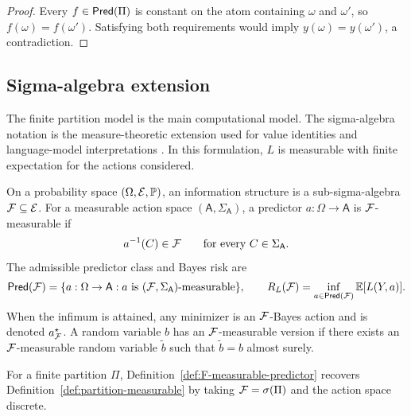\begin{proof}
Every $f\in\mathsf{Pred}(\Pi)$ is constant on the atom containing $\omega$ and $\omega'$, so $f(\omega)=f(\omega')$. Satisfying both requirements would imply $y(\omega)=y(\omega')$, a contradiction.
\end{proof}

\subsection{Sigma-algebra extension}

The finite partition model is the main computational model. The sigma-algebra notation is the measure-theoretic extension used for value identities and language-model interpretations \citep{billingsley1995probability,kallenberg2002foundations}. In this formulation, $L$ is measurable with finite expectation for the actions considered.

\begin{definition}
\label{def:F-measurable-predictor}
On a probability space $(\Omega,\mathcal{E},\mathbb P)$, an information structure is a sub-sigma-algebra $\mathcal{F}\subseteq\mathcal{E}$. For a measurable action space $(\mathsf A,\Sigma_{\mathsf A})$, a predictor $a:\Omega\to\mathsf A$ is $\mathcal{F}$-measurable if
\begin{align*}
a^{-1}(C)\in\mathcal{F}
\qquad
\text{for every }C\in\Sigma_{\mathsf A}.
\end{align*}
The admissible predictor class and Bayes risk are
\begin{align*}
\mathsf{Pred}(\mathcal{F})
=
\{a:\Omega\to\mathsf A:a\text{ is }(\mathcal{F},\Sigma_{\mathsf A})\text{-measurable}\},
\qquad
R_L(\mathcal{F})=\inf_{a\in\mathsf{Pred}(\mathcal{F})}\operatorname*{\mathbb{E}}[L(Y,a)].
\end{align*}
When the infimum is attained, any minimizer is an $\mathcal{F}$-Bayes action and is denoted $a_{\mathcal{F}}^\star$. A random variable $b$ has an $\mathcal{F}$-measurable version if there exists an $\mathcal{F}$-measurable random variable $\tilde b$ such that $\tilde b=b$ almost surely.
\end{definition}

For a finite partition $\Pi$, Definition~\ref{def:F-measurable-predictor} recovers Definition~\ref{def:partition-measurable} by taking $\mathcal{F}=\sigma(\Pi)$ and the action space discrete.

